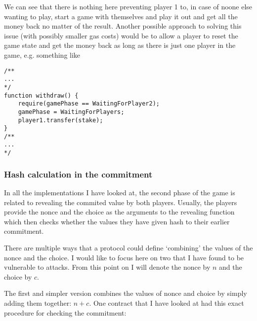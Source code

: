 \documentclass{article}
\begin{document}
    \noindent We can see that there is nothing here
    preventing player 1 to, in case of noone else wanting to
    play, start a game with themselves and play it out and
    get all the money back no matter of the result. Another
    possible approach to solving this issue (with possibly
    smaller gas costs) would be to allow a player to reset
    the game state and get the money back as long as there
    is just one player in the game, e.g. something like

    \begin{lstlisting}[language=Solidity]
/**
...
*/
function withdraw() {
    require(gamePhase == WaitingForPlayer2);
    gamePhase = WaitingForPlayers;
    player1.transfer(stake);
}
/**
...
*/
    \end{lstlisting}

    \subsubsection{Hash calculation in the commitment}
    In all the implementations I have looked at, the second
    phase of the game is related to revealing the commited
    value by both players. Usually, the players provide the
    nonce and the choice as the arguments to the revealing
    function which then checks whether the values they have
    given hash to their earlier commitment.
    \newline

    \noindent There are multiple ways that a protocol could
    define `combining' the values of the nonce and the
    choice. I would like to focus here on two that I have
    found to be vulnerable to attacks. From this point on I
    will denote the nonce by \(n\) and the choice by \(c\).
    \newline

    \noindent The first and simpler version combines the
    values of nonce and choice by simply adding them
    together: \(n + c\). One contract that I have looked at
    had this exact procedure for checking the commitment:
\end{document}

